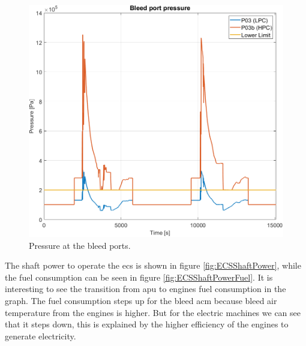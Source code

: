 \documentclass[english]{kththesis}
\begin{document}
\begin{figure}[!ht]
    \centering
    \includegraphics[width=1\textwidth]{Epictures/BleedPortPressure.png}
    \caption{Pressure at the bleed ports.}
    \label{fig:BleedPressure}
\end{figure}

\clearpage

The shaft power to operate the \acrshort{ecs} is shown in figure \ref{fig:ECSShaftPower}, while the fuel consumption can be seen in figure \ref{fig:ECSShaftPowerFuel}. It is interesting to see the transition from \acrshort{apu} to engines fuel consumption in the graph. The fuel consumption steps up for the bleed \acrshort{acm} because bleed air temperature from the engines is higher. But for the electric machines we can see that it steps down, this is explained by the higher efficiency of the engines to generate electricity.
\end{document}
